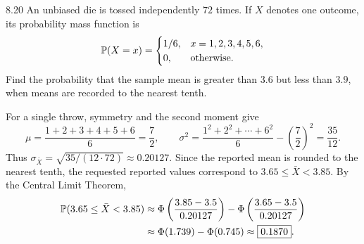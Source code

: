 \documentclass[11pt,oneside]{article}
\begin{document}

\begin{exercise}{8.20}
An unbiased die is tossed independently $72$ times. If $X$ denotes one outcome, its probability mass function is
\[
\mathbb{P}(X=x)=\begin{cases}1/6,&x=1, 2, 3, 4, 5, 6, \\0,&\text{otherwise.}\end{cases}
\]
Find the probability that the sample mean is greater than $3.6$ but less than $3.9$, when means are recorded to the nearest tenth.
\end{exercise}
\begin{solution}
For a single throw, symmetry and the second moment give
\[
\mu=\frac{1+2+3+4+5+6}{6}=\frac72, \qquad
\sigma^2=\frac{1^2+2^2+\cdots+6^2}{6}-\left(\frac72\right)^2=\frac{35}{12}.
\]
Thus $\sigma_{\bar X}=\sqrt{35/(12\cdot72)}\approx0.20127$. Since the reported mean is rounded to the nearest tenth, the requested reported values correspond to $3.65\le\bar X<3.85$. By the Central Limit Theorem,
\[
\begin{aligned}
\mathbb{P}(3.65\le\bar X<3.85)
&\approx\Phi\left(\frac{3.85-3.5}{0.20127}\right)
-\Phi\left(\frac{3.65-3.5}{0.20127}\right)\\
&\approx\Phi(1.739)-\Phi(0.745)\approx\boxed{0.1870}.
\end{aligned}
\]
\end{solution}
\end{document}

